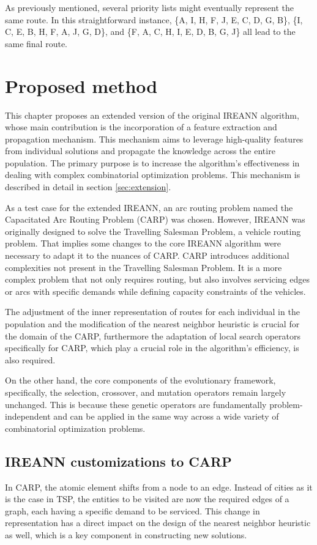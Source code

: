 \documentclass[twoside]{ctuthesis}
\theoremstyle{plain}
\theoremstyle{definition}
\theoremstyle{note}
\begin{document}
As previously mentioned, several priority lists might eventually represent the same route. In this straightforward instance, \{A, I, H, F, J, E, C, D, G, B\}, \{I, C, E, B, H, F, A, J, G, D\}, and \{F, A, C, H, I, E, D, B, G, J\} all lead to the same final route.

\chapter{Proposed method}
\label{sec:proposedmethod}
This chapter proposes an extended version of the original IREANN algorithm, whose main contribution is the incorporation of a feature extraction and propagation mechanism. This mechanism aims to leverage high-quality features from individual solutions and propagate the knowledge across the entire population. The primary purpose is to increase the algorithm's effectiveness in dealing with complex combinatorial optimization problems. This mechanism is described in detail in section \ref{sec:extension}.

As a test case for the extended IREANN, an arc routing problem named the Capacitated Arc Routing Problem (CARP) was chosen. However, IREANN was originally designed to solve the Travelling Salesman Problem, a vehicle routing problem. That implies some changes to the core IREANN algorithm were necessary to adapt it to the nuances of CARP. CARP introduces additional complexities not present in the Travelling Salesman Problem. It is a more complex problem that not only requires routing, but also involves servicing edges or arcs with specific demands while defining capacity constraints of the vehicles.

The adjustment of the inner representation of routes for each individual in the population and the modification of the nearest neighbor heuristic is crucial for the domain of the CARP, furthermore the adaptation of local search operators specifically for CARP, which play a crucial role in the algorithm's efficiency, is also required.

On the other hand, the core components of the evolutionary framework, specifically, the selection, crossover, and mutation operators remain largely unchanged. This is because these genetic operators are fundamentally problem-independent and can be applied in the same way across a wide variety of combinatorial optimization problems.

\section{IREANN customizations to CARP}
In CARP, the atomic element shifts from a node to an edge. Instead of cities as it is the case in TSP, the entities to be visited are now the required edges of a graph, each having a specific demand to be serviced. This change in representation has a direct impact on the design of the nearest neighbor heuristic as well, which is a key component in constructing new solutions.
\end{document}
